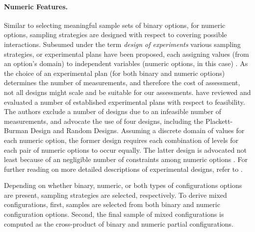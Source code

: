\paragraph{Numeric Features.}
Similar to selecting meaningful sample sets of binary options, for numeric
options, sampling strategies are designed with respect to covering possible
interactions. Subsumed under the term \emph{design of experiments} various
sampling strategies, or experimental plans have been proposed, each assigning values
(from an option’s domain) to independent variables (numeric options, in this
case) \citep{antony_design_2014}. As the choice of an experimental plan (for
both binary and numeric options) determines the number of measurements, and therefore the cost of
assessment, not all designs might scale and be suitable for our assessments.
\cite{siegmund_performance-influence_2015} have reviewed and evaluated a number
of established experimental plans with respect to feasibility. The authors exclude a number of
designs due to an infeasible number of measurements, and advocate the use of
four designs, including the Plackett-Burman Design and Random Designs. Assuming
a discrete domain of values for each numeric option, the former design requires
each combination of levels for each pair of numeric options to occur equally.
The latter design is advocated not least because of an negligible number of
constraints among numeric options \citep{siegmund_performance-influence_2015}.
For further reading on more detailed descriptions of experimental designs, refer
to \cite{antony_design_2014}. 

Depending on whether binary, numeric, or both
types of configurations options are present, sampling strategies are selected,
respectively. To derive mixed configurations, first, samples are selected from
both binary and numeric configuration options. Second, the final sample
of mixed configurations is computed as the cross-product of binary and numeric
partial configurations.
